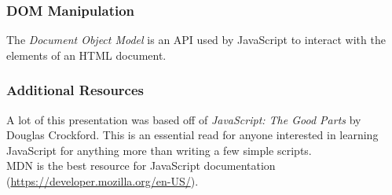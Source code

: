 \documentclass{lug}
\begin{document}
\begin{frame}
    \frametitle{DOM Manipulation}

    The \textit{Document Object Model} is an API used by JavaScript to interact with the elements of
    an HTML document.\footnotemark[1]

\end{frame}

\begin{frame}
    \frametitle{Additional Resources}

    A lot of this presentation was based off of \textit{JavaScript: The Good Parts} by Douglas
    Crockford. This is an essential read for anyone interested in learning JavaScript for anything
    more than writing a few simple scripts.\\

    MDN is the best resource for JavaScript documentation
    (\url{https://developer.mozilla.org/en-US/}).
\end{frame}
\end{document}

